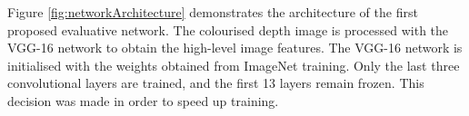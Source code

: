 
Figure \ref{fig:networkArchitecture} demonstrates the architecture of the first proposed evaluative network. The colourised depth image is processed with the VGG-16 network \cite{Simonyan14c} to obtain the high-level image features. The VGG-16 network is initialised with the weights obtained from ImageNet training. Only the last three convolutional layers are trained, and the first 13 layers remain frozen. This decision was made in order to speed up training.

